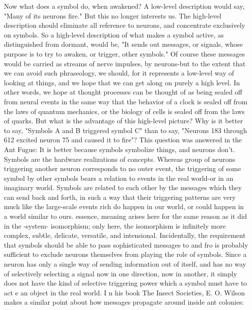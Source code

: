   Now what does a symbol do, when awakened? A low-level description would say,
"Many of its neurons fire." But this no longer interests us. The high-level description
should eliminate all reference to neurons, and concentrate exclusively on symbols. So a
high-level description of what makes a symbol active, as distinguished from dormant,
would be, "It sends out messages, or signals, whose purpose is to try to awaken, or
trigger, other symbols." Of course these messages would be carried as streams of nerve
impulses, by neurons-but to the extent that we can avoid such phraseology, we should,
for it represents a low-level way of looking at things, and we hope that we can get along
on purely a high level. In other words, we hope at thought processes can be thought of as
being sealed off from neural events in the same way that the behavior of a clock is sealed
off from the laws of quantum mechanics, or the biology of cells is sealed off from the
laws of quarks.
  But what is the advantage of this high-level picture? Why is it better to say, "Symbols A
and B triggered symbol C" than to say, "Neurons 183 through 612 excited neuron 75 and
caused it to fire"? This question was answered in the Ant Fugue: It is better because
symbols symbolize things, and neurons don't. Symbols are the hardware realizations of
concepts. Whereas group of neurons triggering another neuron corresponds to no outer
event, the triggering of some symbol by other symbols bears a relation to events in the
real world-or in an imaginary world. Symbols are related to each other by the messages
which they can send back and forth, in such a way that their triggering patterns are very
much like the large-scale events rich do happen in our world, or could happen in a world
similar to ours. essence, meaning arises here for the same reason as it did in the -system-
isomorphism; only here, the isomorphism is infinitely more complex, subtle, delicate,
versatile, and intensional.
  Incidentally, the requirement that symbols should be able to pass sophisticated
messages to and fro is probably sufficient to exclude neurons themselves from playing
the role of symbols. Since a neuron has only a single way of sending information out of
itself, and has no way of selectively selecting a signal now in one direction, now in
another, it simply does not have the kind of selective triggering power which a symbol
must have to act e an object in the real world. I n his book The Insect Societies, E. O.
Wilson makes a similar point about how messages propagate around inside ant colonies:


